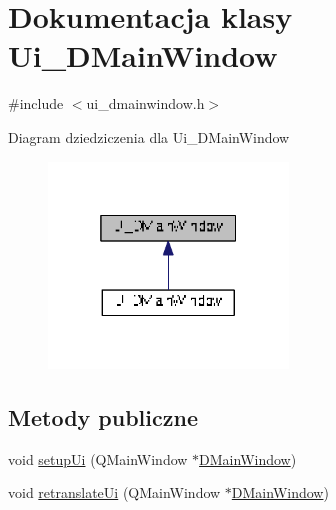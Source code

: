 \hypertarget{class_ui___d_main_window}{}\section{Dokumentacja klasy Ui\+\_\+\+D\+Main\+Window}
\label{class_ui___d_main_window}


{\ttfamily \#include $<$ui\+\_\+dmainwindow.\+h$>$}



Diagram dziedziczenia dla Ui\+\_\+\+D\+Main\+Window
\nopagebreak
\begin{figure}[H]
\begin{center}
\leavevmode
\includegraphics[width=181pt]{class_ui___d_main_window__inherit__graph}
\end{center}
\end{figure}
\subsection*{Metody publiczne}
\begin{DoxyCompactItemize}
\item 
void \hyperlink{class_ui___d_main_window_aa53f3a89bf520704a3e79037df2fd451}{setup\+Ui} (Q\+Main\+Window $\ast$\hyperlink{class_d_main_window}{D\+Main\+Window})
\item 
void \hyperlink{class_ui___d_main_window_a406169c751ddfd205b89375c7542827c}{retranslate\+Ui} (Q\+Main\+Window $\ast$\hyperlink{class_d_main_window}{D\+Main\+Window})
\end{DoxyCompactItemize}
